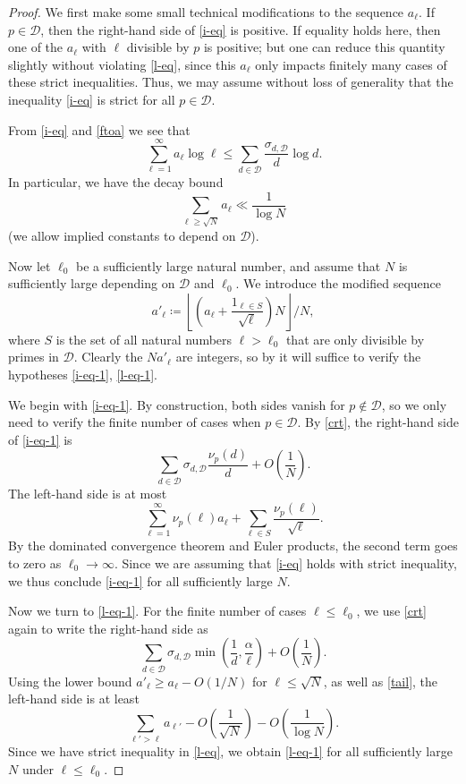 \documentclass[10pt,a4paper,reqno]{amsart}
\numberwithin{equation}{section}
\theoremstyle{plain}
\theoremstyle{definition}
\begin{document}
\begin{proof}  We first make some small technical modifications to the sequence $a_\ell$. If $p \in {\mathcal D}$, then the right-hand side of \eqref{i-eq} is positive.  If equality holds here, then one of the $a_\ell$ with $\ell$ divisible by $p$ is positive; but one can reduce this quantity slightly without violating \eqref{l-eq}, since this $a_\ell$ only impacts finitely many cases of these strict inequalities.  Thus, we may assume without loss of generality that the inequality \eqref{i-eq} is strict for all $p \in {\mathcal D}$.

From \eqref{i-eq} and \eqref{ftoa} we see that
$$ \sum_{\ell=1}^\infty a_\ell \log \ell \leq \sum_{d \in {\mathcal D}} \frac{\sigma_{d,{\mathcal D}}}{d} \log d.$$
In particular, we have the decay bound
\begin{equation}\label{tail}
  \sum_{\ell \geq \sqrt{N}} a_\ell \ll \frac{1}{\log N}
\end{equation}
(we allow implied constants to depend on ${\mathcal D}$).

Now let $\ell_0$ be a sufficiently large natural number, and assume that $N$ is sufficiently large depending on ${\mathcal D}$ and $\ell_0$.  We introduce the modified sequence
$$ a'_\ell \coloneqq \left\lfloor \left(a_\ell + \frac{1_{\ell \in S}}{\sqrt{\ell}}\right) N \right\rfloor / N,$$
where $S$ is the set of all natural numbers $\ell > \ell_0$ that are only divisible by primes in ${\mathcal D}$.
Clearly the $N a'_\ell$ are integers, so by  it will suffice to verify the hypotheses \eqref{i-eq-1}, \eqref{l-eq-1}.

We begin with \eqref{i-eq-1}.  By construction, both sides vanish for $p \not \in {\mathcal D}$, so we only need to verify the finite number of cases when $p \in {\mathcal D}$.  By \eqref{crt}, the right-hand side of \eqref{i-eq-1} is
$$ \sum_{d \in {\mathcal D}} \sigma_{d,{\mathcal D}} \frac{\nu_p(d)}{d} + O\left(\frac{1}{N} \right).$$
The left-hand side is at most
$$ \sum_{\ell=1}^\infty \nu_p(\ell) a_\ell + \sum_{\ell \in S} \frac{\nu_p(\ell)}{\sqrt{\ell}}.$$
By the dominated convergence theorem and Euler products, the second term goes to zero as $\ell_0 \to \infty$.  Since we are assuming that \eqref{i-eq} holds with strict inequality, we thus conclude \eqref{i-eq-1} for all sufficiently large $N$.

Now we turn to \eqref{l-eq-1}.  For the finite number of cases $\ell \leq \ell_0$, we use \eqref{crt} again to write the right-hand side as
$$ \sum_{d \in {\mathcal D}} \sigma_{d,{\mathcal D}} \min\left( \frac{1}{d}, \frac{\alpha}{\ell}\right) + O\left(\frac{1}{N} \right).$$
Using the lower bound $a'_\ell \geq a_\ell - O(1/N)$ for $\ell \leq \sqrt{N}$, as well as \eqref{tail}, the left-hand side is at least
$$ \sum_{\ell' > \ell} a_{\ell'} - O\left(\frac{1}{\sqrt{N}} \right) - O\left(\frac{1}{\log N} \right).$$
Since we have strict inequality in \eqref{l-eq}, we obtain \eqref{l-eq-1} for all sufficiently large $N$ under $\ell \leq \ell_0$.


\end{proof}
\end{document}
